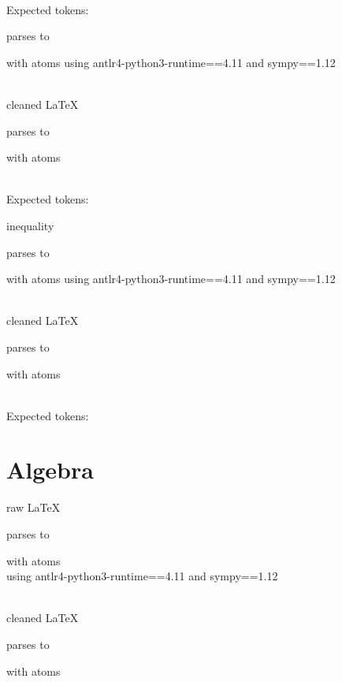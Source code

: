 \documentclass{article}
\begin{document}
\ \\
Expected tokens:


\hrulefill


parses to

with atoms
using antlr4-python3-runtime==4.11 and sympy==1.12

\ \\
cleaned \LaTeX

parses to

with atoms


\ \\
Expected tokens:



\hrulefill

inequality

parses to

with atoms
using antlr4-python3-runtime==4.11 and sympy==1.12

\ \\
cleaned \LaTeX

parses to

with atoms


\ \\
Expected tokens:


\hrulefill

\section{Algebra}

\hrulefill

raw \LaTeX

parses to 

with atoms 
\\
using antlr4-python3-runtime==4.11 and sympy==1.12

\ \\
cleaned \LaTeX

parses to 

with atoms 

\end{document}
